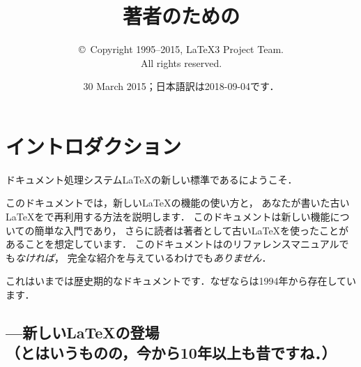 \documentclass{ltxguide}[2001/05/28]
\title{著者のための\LaTeXe}
\author{\copyright~Copyright 1995--2015, \LaTeX3 Project Team.\\
   All rights reserved.}
\date{30 March 2015；日本語訳は2018-09-04です．}
\begin{document}
\maketitle

\tableofcontents

\section{イントロダクション}

ドキュメント処理システム\LaTeX{}の新しい標準である\LaTeXe{}にようこそ．

このドキュメントでは，新しい\LaTeX{}の機能の使い方と，
あなたが書いた古い\LaTeX{}を\LaTeXe{}で再利用する方法を説明します．
このドキュメントは新しい機能についての簡単な入門であり，
さらに読者は著者として古い\LaTeX{}を使ったことがあることを想定しています．
このドキュメントは\LaTeXe{}のリファレンスマニュアルでも\emph{なければ}，
完全な紹介を与えているわけでも\emph{ありません}．

これはいまでは歴史期的なドキュメントです．なぜなら\LaTeXe{}は1994年から存在しています．

\subsection[\LaTeXe--- 新しい\LaTeX{}の登場]
  {\LaTeXe---新しい\LaTeX{}の登場\\ （とはいうものの，今から10年以上も昔ですね．）}
\end{document}
